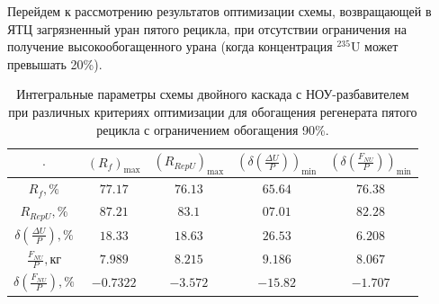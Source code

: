 Перейдем к рассмотрению результатов оптимизации схемы, возвращающей в ЯТЦ загрязненный уран пятого рецикла, при отсутствии ограничения на получение высокообогащенного урана (когда концентрация $^{235}$U может превышать 20\%).

\begin{table}
    \begin{tabular}{ccccc}
    $\cdot$ & $(R_f)_\text{max}$ & $(R_{RepU})_\text{max}$ & $(\delta(\frac{\Delta U}{P}))_\text{min}$ & $(\delta(\frac{F_{NU}}{P}))_\text{min}$\\ \hline
    $R_f, \%$ & $77.17$ & $76.13$ & $65.64$ & $76.38$\\ \hline
    $R_{RepU}, \%$  & $87.21$ & $83.1$ & $07.01$ & $82.28$\\ \hline
    $\delta(\frac{\Delta U}{P}), \%$ & $18.33$ & $18.63$ & $26.53$ & $6.208$\\ \hline
    $\frac{F_{NU}}{P}, \text{кг}$ & $7.989$ & $8.215$ & $9.186$ & $8.067$\\ \hline
    $\delta(\frac{F_{NU}}{P}), \%$ & $-0.7322$ & $-3.572$ & $-15.82$ & $-1.707$\\ \hline
\end{tabular}
\caption{Интегральные параметры схемы двойного каскада с НОУ-разбавителем при различных критериях оптимизации для обогащения регенерата пятого рецикла с ограничением обогащения 90\%.{\label{2opt5_90_int}}}
\end{table}


